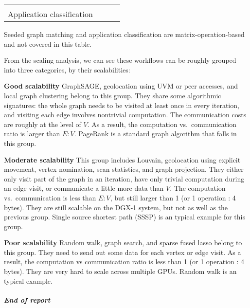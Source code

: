 \documentclass[10pt,oneside]{memoir}
\let\oldsubparagraph\subparagraph
\renewcommand{\subparagraph}[1]{\oldsubparagraph{#1}\mbox{}}
\begin{document}
\begin{longtable}[]{@{}llll@{}}
\begin{minipage}[t]{0.14\columnwidth}
\strut
\end{minipage}\tabularnewline
\begin{minipage}[t]{0.25\columnwidth}\raggedright
Application classification\strut
\end{minipage} & \begin{minipage}[t]{0.37\columnwidth}\raggedright
\strut
\end{minipage} & \begin{minipage}[t]{0.12\columnwidth}\raggedright
\strut
\end{minipage} & \begin{minipage}[t]{0.14\columnwidth}\raggedright
\strut
\end{minipage}\tabularnewline
\bottomrule
\end{longtable}

Seeded graph matching and application classification are
matrix-operation-based and not covered in this table.

From the scaling analysis, we can see these workflows can be roughly
grouped into three categories, by their scalabilities:

\textbf{Good scalability} GraphSAGE, geolocation using UVM or peer
accesses, and local graph clustering belong to this group. They share
some algorithmic signatures: the whole graph needs to be visited at
least once in every iteration, and visiting each edge involves
nontrivial computation. The communication costs are roughly at the level
of \(V\). As a result, the computation vs.~communication ratio is larger
than \(E : V\). PageRank is a standard graph algorithm that falls in
this group.

\textbf{Moderate scalability} This group includes Louvain, geolocation
using explicit movement, vertex nomination, scan statistics, and graph
projection. They either only visit part of the graph in an iteration,
have only trivial computation during an edge visit, or communicate a
little more data than \(V\). The computation vs.~communication is less
than \(E : V\), but still larger than 1 (or 1 operation : 4 bytes). They
are still scalable on the DGX-1 system, but not as well as the previous
group. Single source shortest path (SSSP) is an typical example for this
group.

\textbf{Poor scalability} Random walk, graph search, and sparse fused
lasso belong to this group. They need to send out some data for each
vertex or edge visit. As a result, the computation vs communication
ratio is less than 1 (or 1 operation : 4 bytes). They are very hard to
scale across multiple GPUs. Random walk is an typical example.

\hypertarget{end-of-report}{%
\subparagraph{End of report}\label{end-of-report}}
\end{document}

